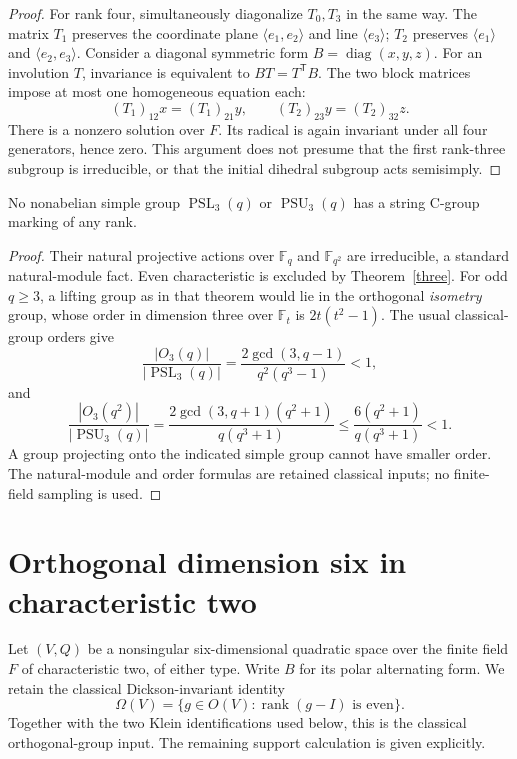 \documentclass[11pt,a4paper]{article}
\newcommand{\gen}[1]{\langle #1\rangle}\newcommand{\im}{\operatorname{im}}\newcommand{\GL}{\operatorname{GL}}\newcommand{\PGL}{\operatorname{PGL}}
\begin{document}
\begin{proof}
For rank four, simultaneously diagonalize $T_0,T_3$ in the same way.
The matrix $T_1$ preserves the coordinate plane $\gen{e_1,e_2}$ and line
$\gen{e_3}$; $T_2$ preserves $\gen{e_1}$ and $\gen{e_2,e_3}$.
Consider a diagonal symmetric form $B=\operatorname{diag}(x,y,z)$.
For an involution $T$, invariance is equivalent to $BT=T^{\mathsf T}B$.
The two block matrices impose at most one homogeneous equation each:
\[
 (T_1)_{12}x=(T_1)_{21}y,\qquad
 (T_2)_{23}y=(T_2)_{32}z.
\]
There is a nonzero solution over $F$. Its radical is again invariant under
all four generators, hence zero. This argument does not presume that the
first rank-three subgroup is irreducible, or that the initial dihedral
subgroup acts semisimply.
\end{proof}

\begin{proposition}\label{psl3}
No nonabelian simple group $\operatorname{PSL}_3(q)$ or
$\operatorname{PSU}_3(q)$ has a string C-group marking of any rank.
\end{proposition}
\begin{proof}
Their natural projective actions over $\mathbb F_q$ and $\mathbb F_{q^2}$
are irreducible, a standard natural-module fact. Even characteristic is
excluded by Theorem~\ref{three}. For odd $q\ge3$, a lifting group as in that
theorem would lie in the orthogonal \emph{isometry} group, whose order in
dimension three over $\mathbb F_t$ is $2t(t^2-1)$.
The usual classical-group orders give
\[
 \frac{|O_3(q)|}{|\operatorname{PSL}_3(q)|}
 =\frac{2\gcd(3,q-1)}{q^2(q^3-1)}<1,
\]
and
\[
 \frac{|O_3(q^2)|}{|\operatorname{PSU}_3(q)|}
 =\frac{2\gcd(3,q+1)(q^2+1)}{q(q^3+1)}
 \le\frac{6(q^2+1)}{q(q^3+1)}<1.
\]
A group projecting onto the indicated simple group cannot have smaller order.
The natural-module and order formulas are retained classical inputs;
no finite-field sampling is used.
\end{proof}

\section{Orthogonal dimension six in characteristic two}
Let $(V,Q)$ be a nonsingular six-dimensional quadratic space over the finite
field $F$ of characteristic two, of either type. Write $B$ for its polar
alternating form. We retain the classical Dickson-invariant identity
\[
 \Omega(V)=\{g\in O(V):\operatorname{rank}(g-I)\text{ is even}\}.
\tag{2}
\]
Together with the two Klein identifications used below, this is the classical
orthogonal-group input. The remaining support calculation is given explicitly.
\end{document}
